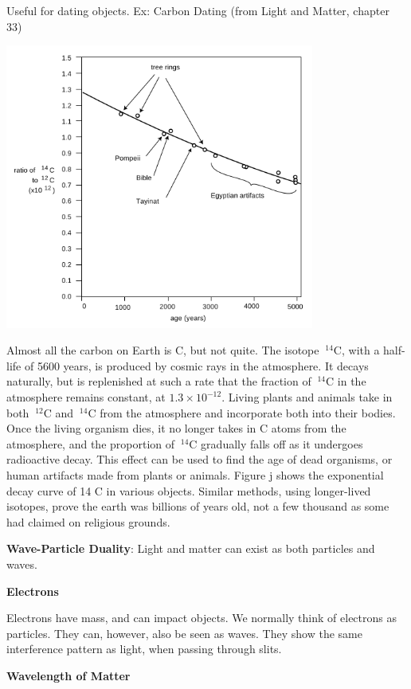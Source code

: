 \documentclass[12pt]{article}
\begin{document}
Useful for dating objects. Ex: Carbon Dating (from Light and Matter, chapter 33)
\begin{center}
\includegraphics[width=4in]{../images/carbonDating.png}
\end{center}

Almost all the carbon on Earth is C, but not quite. The isotope
$~^{14}$C, with a half-life of 5600 years, is produced by cosmic rays in
the atmosphere. It decays naturally, but is replenished at such a
rate that the fraction of $~^{14}$C in the atmosphere remains constant,
at $1.3\times 10^{-12}$. Living plants and animals take in both $~^{12}$C and
$~^{14}$C from the atmosphere and incorporate both into their bodies.
Once the living organism dies, it no longer takes in C atoms from
the atmosphere, and the proportion of $~^{14}$C gradually falls off as
it undergoes radioactive decay. This effect can be used to find
the age of dead organisms, or human artifacts made from plants
or animals. Figure j shows the exponential decay curve of 14 C
in various objects. Similar methods, using longer-lived isotopes,
prove the earth was billions of years old, not a few thousand as
some had claimed on religious grounds.

\textbf{Wave-Particle Duality}: Light and matter can exist as both particles and waves.

\textbf{Electrons}

Electrons have mass, and can impact objects. We normally think of electrons as particles. They can, however, also be seen as waves. They show the same interference pattern as light, when passing through slits.

\textbf{Wavelength of Matter}
\end{document}
